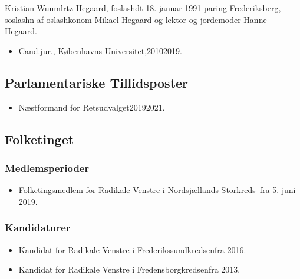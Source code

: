 \documentclass[11pt, a4paper]{awesome-cv}
\begin{document}
\makecvheader[R]
\makelettertitle
\begin{cvletter}
Kristian Wuumlrtz Hegaard, foslashdt 18. januar 1991 paring Frederiksberg, soslashn af oslashkonom Mikael Hegaard og lektor og jordemoder Hanne Hegaard.

\begin{itemize}
\item Cand.jur., Københavns Universitet,20102019.
\end{itemize}
\subsection*{Parlamentariske Tillidsposter}
\begin{itemize}
\item Næstformand for Retsudvalget20192021.
\end{itemize}
\subsection*{Folketinget}
\subsubsection*{Medlemsperioder}
\begin{itemize}
\item Folketingsmedlem for Radikale Venstre i Nordsjællands Storkreds fra 5. juni 2019.
\end{itemize}
\subsubsection*{Kandidaturer}
\begin{itemize}
\item Kandidat for Radikale Venstre i Frederikssundkredsenfra 2016.
\item Kandidat for Radikale Venstre i Fredensborgkredsenfra 2013.
\end{itemize}
\end{cvletter}
\end{document}
